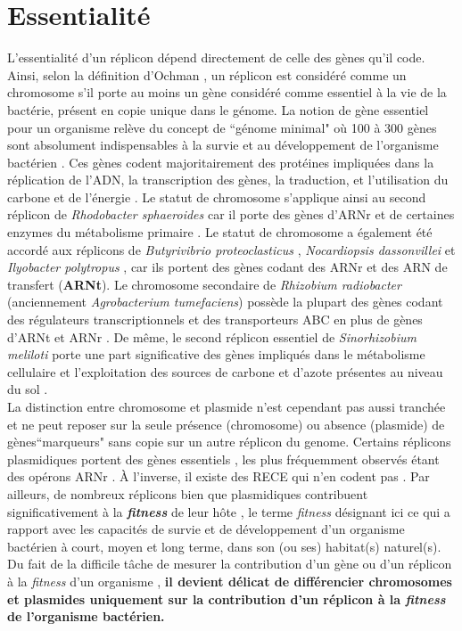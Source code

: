 \section{Essentialité}\label{chrIIess}
	L'essentialité d'un réplicon dépend directement de celle des gènes qu'il code. Ainsi, selon la définition d'Ochman \citep{Ochman2002}, un réplicon est considéré comme un chromosome s'il porte au moins un gène considéré comme essentiel à la vie de la bactérie, présent en copie unique dans le génome. La notion de gène essentiel pour un organisme relève du concept de ``génome minimal" où 100 à 300 gènes sont absolument indispensables à la survie et au développement de l'organisme bactérien \citep{Koonin2000,Glass2006}. Ces gènes codent majoritairement des protéines impliquées dans la réplication de l'ADN, la transcription des gènes, la traduction, et l'utilisation du carbone et de l'énergie \citep{MacLellan2004}. Le statut de chromosome s'applique ainsi au second réplicon de \textit{Rhodobacter sphaeroides} car il porte des gènes d'ARNr et de certaines enzymes du métabolisme primaire \citep{suwanto1989physical}. Le statut de chromosome a également été accordé aux réplicons de \textit{Butyrivibrio proteoclasticus} \citep{Kelly2010}, \textit{Nocardiopsis dassonvillei} \citep{Sun2010} et \textit{Ilyobacter polytropus} \citep{Sikorski2010}, car ils portent des gènes codant des ARNr et des ARN de transfert (\textbf{ARNt}). Le chromosome secondaire de \textit{Rhizobium radiobacter} (anciennement \textit{Agrobacterium tumefaciens}) possède la plupart des gènes codant des régulateurs transcriptionnels et des transporteurs ABC en plus de gènes d'ARNt et ARNr \citep{MacLellan2004}. De même, le second réplicon essentiel de \textit{Sinorhizobium meliloti} porte une part significative des gènes impliqués dans le métabolisme cellulaire et l'exploitation des sources de carbone et d'azote présentes au niveau du sol \citep{MacLellan2004}.\\
      La distinction entre chromosome et plasmide n'est cependant pas aussi tranchée et ne peut reposer sur la seule présence (chromosome) ou absence (plasmide) de gènes``marqueurs" sans copie sur un autre réplicon du genome. Certains réplicons plasmidiques portent des gènes essentiels \citep{Yeoman2011}, les plus fréquemment observés étant des opérons ARNr \citep{baril1992scattering,salanoubat2002genome,moran2004genome,pohlmann2006genome}. À l'inverse, il existe des RECE qui n'en codent pas \citep{Heidelberg2000,Nascimento2004}. Par ailleurs, de nombreux réplicons bien que plasmidiques contribuent significativement à la \textit{\textbf{fitness}} de leur hôte \citep{MacLellan2004,Krone2007,lopez2012rhizobial}, le terme \textit{fitness} désignant ici ce qui a rapport avec les capacités de survie et de développement d'un organisme bactérien à court, moyen et long terme, dans son (ou ses) habitat(s) naturel(s). Du fait de la difficile tâche de mesurer la contribution d'un gène ou d'un réplicon à la \textit{fitness} d'un organisme \citep{Mackenzie2004}, \textbf{il devient délicat de différencier chromosomes et plasmides uniquement sur la contribution d'un réplicon à la \textit{fitness} de l'organisme bactérien.} \\
